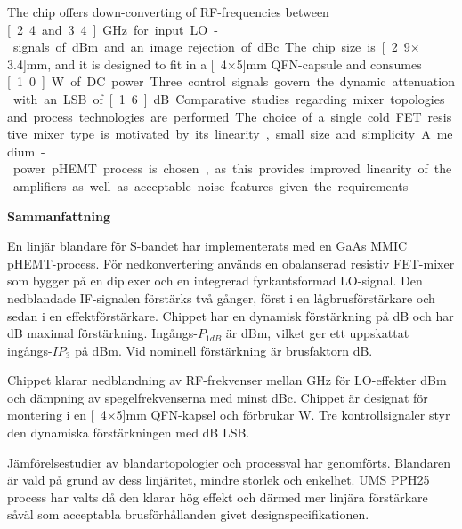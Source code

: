 	The chip offers down-converting of RF-frequencies between \unit[2.4 and 3.4]{GHz} for input LO-signals of \unit[-4--0]{dBm} and an image rejection of \unit[40]{dBc}. The chip size is \unit[2.9$\times$3.4]{mm}, and it is designed to fit in a \unit[4$\times$5]{mm} QFN-capsule and consumes \unit[1.0]{W} of DC power. Three control signals govern the dynamic attenuation with an LSB of \unit[1.6]{dB}.
	
	Comparative studies regarding mixer topologies and process technologies are performed. The choice of a single cold FET resistive mixer type is motivated by its linearity, small size and simplicity. A medium-power pHEMT process is chosen, as this provides improved linearity of the amplifiers as well as acceptable noise features given the requirements.

{}
\vspace{1.5cm}
\begin{center}
{\bf Sammanfattning} \\[0.4cm]
\end{center}
	En linjär blandare för S-bandet har implementerats med en \unit[0,25]{\mum} GaAs MMIC pHEMT-process. För nedkonvertering används en obalanserad resistiv FET-mixer som bygger på en diplexer och en integrerad fyrkantsformad LO-signal. Den nedblandade IF-signalen förstärks två gånger, först i en lågbrusförstärkare och sedan i en effektförstärkare. Chippet har en dynamisk förstärkning på \unit[10,5]{dB} och har \unit[15]{dB} maximal förstärkning. Ingångs-$P_{1dB}$ är \unit[10]{dBm}, vilket ger ett uppskattat ingångs-$IP_3$ på \unit[20]{dBm}. Vid nominell förstärkning är brusfaktorn \unit[11]{dB}.
	
Chippet klarar nedblandning av RF-frekvenser mellan \unit[2,9 och 3,4]{GHz} för LO-effekter \unit[-4--0]{dBm} och dämpning av spegelfrekvenserna med minst \unit[40]{dBc}. Chippet är designat för montering i en \unit[4$\times$5]{mm} QFN-kapsel och förbrukar \unit[1,0]{W}. Tre kontrollsignaler styr den dynamiska förstärkningen med \unit[1,6]{dB} LSB.

Jämförelsestudier av blandartopologier och processval har genomförts. Blandaren är vald på grund av dess linjäritet, mindre storlek och enkelhet. UMS PPH25 process har valts då den klarar hög effekt och därmed mer linjära förstärkare såväl som acceptabla brusförhållanden givet design\-specifikationen.


